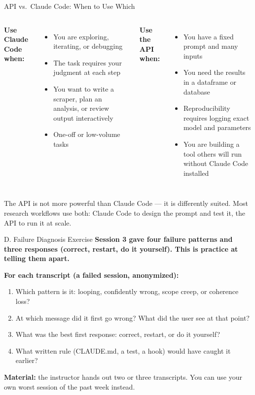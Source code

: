 \documentclass[aspectratio=169, 11pt]{beamer}
\begin{document}
\begin{frame}{API vs.\ Claude Code: When to Use Which}
  \begin{columns}[T]
    \textbf{Use Claude Code when:}
    \begin{itemize}\small
      \item You are exploring, iterating, or debugging
      \item The task requires your judgment at each step
      \item You want to write a scraper, plan an analysis, or review output interactively
      \item One-off or low-volume tasks
    \end{itemize}

    \textbf{Use the API when:}
    \begin{itemize}\small
      \item You have a fixed prompt and many inputs
      \item You need the results in a dataframe or database
      \item Reproducibility requires logging exact model and parameters
      \item You are building a tool others will run without Claude Code installed
    \end{itemize}
  \end{columns}

  \vspace{0.8em}
  \alert{\small The API is not more powerful than Claude Code --- it is differently suited. Most research workflows use both: Claude Code to design the prompt and test it, the API to run it at scale.}
  \vfill
  \hyperlink{backmatter}{}
\end{frame}



\begin{frame}[label=failure]{D. Failure Diagnosis Exercise}
  \textbf{Session 3 gave four failure patterns and three responses (correct, restart, do it yourself). This is practice at telling them apart.}

  \vspace{0.5em}
  \textbf{For each transcript (a failed session, anonymized):}
  \begin{enumerate}
    \item Which pattern is it: looping, confidently wrong, scope creep, or coherence loss?
    \item At which message did it first go wrong? What did the user see at that point?
    \item What was the best first response: correct, restart, or do it yourself?
    \item What written rule (CLAUDE.md, a test, a hook) would have caught it earlier?
  \end{enumerate}

  \vspace{0.5em}
  {\small \textbf{Material:} the instructor hands out two or three transcripts. You can use your own worst session of the past week instead.}
\end{frame}
\end{document}
